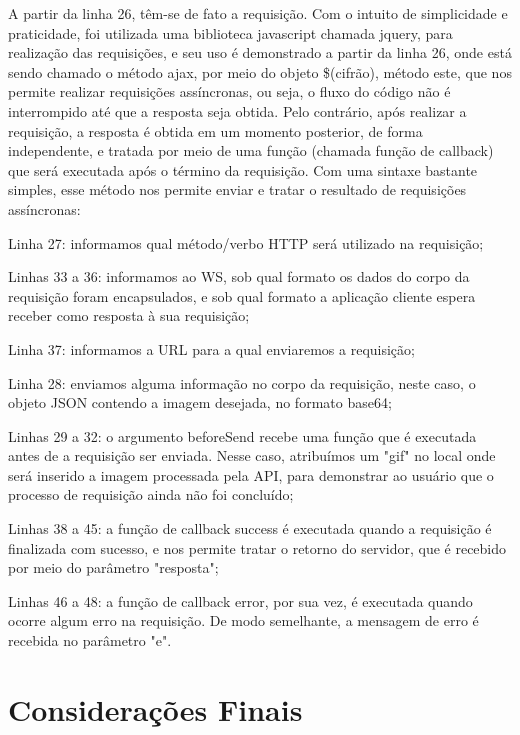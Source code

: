 \documentclass[12pt]{article}
\begin{document}
A partir da linha 26, têm-se de fato a requisição. Com o intuito de simplicidade e praticidade, foi utilizada uma biblioteca javascript chamada jquery, para realização das requisições, e seu uso é demonstrado a partir da linha 26, onde está sendo chamado o método ajax, por meio do objeto \$(cifrão), método este, que nos permite realizar requisições assíncronas, ou seja, o fluxo do código não é interrompido até que a resposta seja obtida. Pelo contrário, após realizar a requisição, a resposta é obtida em um momento posterior, de forma independente, e tratada por meio de uma função (chamada função de callback) que será executada após o término da requisição. Com uma sintaxe bastante simples, esse método nos permite enviar e tratar o resultado de requisições assíncronas:

Linha 27: informamos qual método/verbo HTTP será utilizado na requisição;

Linhas 33 a 36: informamos ao WS, sob qual formato os dados do corpo da requisição foram encapsulados, e sob qual formato a aplicação cliente espera receber como resposta à sua requisição;

Linha 37: informamos a URL para a qual enviaremos a requisição;

Linha 28: enviamos alguma informação no corpo da requisição, neste caso, o objeto JSON contendo a imagem desejada, no formato base64;

Linhas 29 a 32: o argumento beforeSend recebe uma função que é executada antes de a requisição ser enviada. Nesse caso, atribuímos um "gif" no local onde será inserido a imagem processada pela API, para demonstrar ao usuário que o processo de requisição ainda não foi concluído;

Linhas 38 a 45: a função de callback success é executada quando a requisição é finalizada com sucesso, e nos permite tratar o retorno do servidor, que é recebido por meio do parâmetro "resposta";

Linhas 46 a 48: a função de callback error, por sua vez, é executada quando ocorre algum erro na requisição. De modo semelhante, a mensagem de erro é recebida no parâmetro "e".

\section{Considerações Finais}

\end{document}
